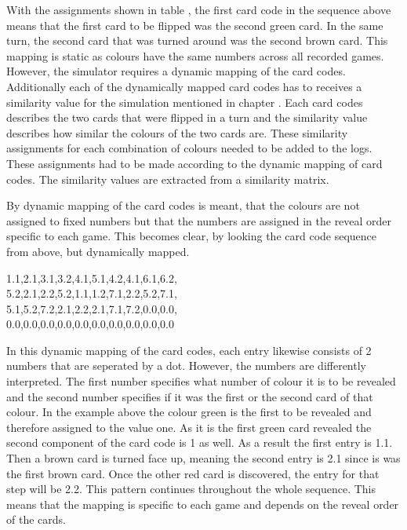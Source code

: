 With the assignments shown in table , the first card code in the sequence above means that the first card to be flipped was the second green card. In the same turn, the second card that was turned around was the second brown card. This mapping is static as colours have the same numbers across all recorded games. However, the simulator requires a dynamic mapping of the card codes. Additionally each of the dynamically mapped card codes has to receives a similarity value for the simulation mentioned in chapter . Each card codes describes the two cards that were flipped in a turn and the similarity value describes how similar the colours of the two cards are. These similarity assignments for each combination of colours needed to be added to the logs. These assignments had to be made according to the dynamic mapping of card codes. The similarity values are extracted from a similarity matrix. 

By dynamic mapping of the card codes is meant, that the colours are not assigned to fixed numbers but that the numbers are assigned in the reveal order specific to each game. This becomes clear, by looking the card code sequence from above, but dynamically mapped.
\begin{center}
	1.1,2.1,3.1,3.2,4.1,5.1,4.2,4.1,6.1,6.2,\\
	5.2,2.1,2.2,5.2,1.1,1.2,7.1,2.2,5.2,7.1,\\
	5.1,5.2,7.2,2.1,2.2,2.1,7.1,7.2,0.0,0.0,\\
	0.0,0.0,0.0,0.0,0.0,0.0,0.0,0.0,0.0,0.0
\end{center}

In this dynamic mapping of the card codes, each entry likewise consists of 2 numbers that are seperated by a dot. However, the numbers are differently interpreted. The first number specifies what number of colour it is to be revealed and the second number specifies if it was the first or the second card of that colour. In the example above the colour green is the first to be revealed and therefore assigned to the value one. As it is the first green card revealed the second component of the card code is 1 as well. As a result the first entry is 1.1. Then a brown card is turned face up, meaning the second entry is 2.1 since is was the first brown card. Once the other red card is discovered, the entry for that step will be 2.2. This pattern continues throughout the whole sequence. This means that the mapping is specific to each game and depends on the reveal order of the cards. 

